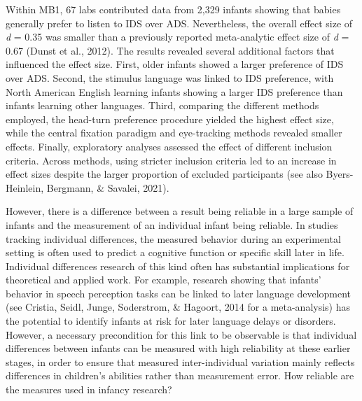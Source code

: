 \documentclass[
  english,
  man,floatsintext]{apa6}
\begin{document}
Within MB1, 67 labs contributed data from 2,329 infants showing that babies generally prefer to listen to IDS over ADS.
Nevertheless, the overall effect size of \emph{d} = 0.35 was smaller than a previously reported meta-analytic effect size of \emph{d} = 0.67 (Dunst et al., 2012).
The results revealed several additional factors that influenced the effect size.
First, older infants showed a larger preference of IDS over ADS.
Second, the stimulus language was linked to IDS preference, with North American English learning infants showing a larger IDS preference than infants learning other languages.
Third, comparing the different methods employed, the head-turn preference procedure yielded the highest effect size, while the central fixation paradigm and eye-tracking methods revealed smaller effects.
Finally, exploratory analyses assessed the effect of different inclusion criteria.
Across methods, using stricter inclusion criteria led to an increase in effect sizes despite the larger proportion of excluded participants (see also Byers-Heinlein, Bergmann, \& Savalei, 2021).

However, there is a difference between a result being reliable in a large sample of infants and the measurement of an individual infant being reliable.
In studies tracking individual differences, the measured behavior during an experimental setting is often used to predict a cognitive function or specific skill later in life.
Individual differences research of this kind often has substantial implications for theoretical and applied work.
For example, research showing that infants' behavior in speech perception tasks can be linked to later language development (see Cristia, Seidl, Junge, Soderstrom, \& Hagoort, 2014 for a meta-analysis) has the potential to identify infants at risk for later language delays or disorders.
However, a necessary precondition for this link to be observable is that individual differences between infants can be measured with high reliability at these earlier stages, in order to ensure that measured inter-individual variation mainly reflects differences in children's abilities rather than measurement error.
How reliable are the measures used in infancy research?
\end{document}

